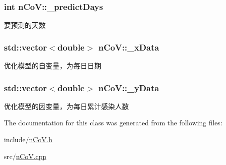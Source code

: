 \subsubsection[{\texorpdfstring{\+\_\+predict\+Days}{_predictDays}}]{\setlength{\rightskip}{0pt plus 5cm}int n\+Co\+V\+::\+\_\+predict\+Days\hspace{0.3cm}{\ttfamily [private]}}\hypertarget{classnCoV_a71d73f9132ff05684bb8f830bd1f4232}{}\label{classnCoV_a71d73f9132ff05684bb8f830bd1f4232}


要预测的天数 

\subsubsection[{\texorpdfstring{\+\_\+x\+Data}{_xData}}]{\setlength{\rightskip}{0pt plus 5cm}std\+::vector$<$double$>$ n\+Co\+V\+::\+\_\+x\+Data\hspace{0.3cm}{\ttfamily [private]}}\hypertarget{classnCoV_a11802f3972f62a07b77b1847f1d010a8}{}\label{classnCoV_a11802f3972f62a07b77b1847f1d010a8}


优化模型的自变量，为每日日期 

\subsubsection[{\texorpdfstring{\+\_\+y\+Data}{_yData}}]{\setlength{\rightskip}{0pt plus 5cm}std\+::vector$<$double$>$ n\+Co\+V\+::\+\_\+y\+Data\hspace{0.3cm}{\ttfamily [private]}}\hypertarget{classnCoV_a8e122688ffc8ee32df05f0cb6ef25920}{}\label{classnCoV_a8e122688ffc8ee32df05f0cb6ef25920}


优化模型的因变量，为每日累计感染人数 



The documentation for this class was generated from the following files\+:\begin{DoxyCompactItemize}
\item 
include/\hyperlink{nCoV_8h}{n\+Co\+V.\+h}\item 
src/\hyperlink{nCoV_8cpp}{n\+Co\+V.\+cpp}\end{DoxyCompactItemize}
